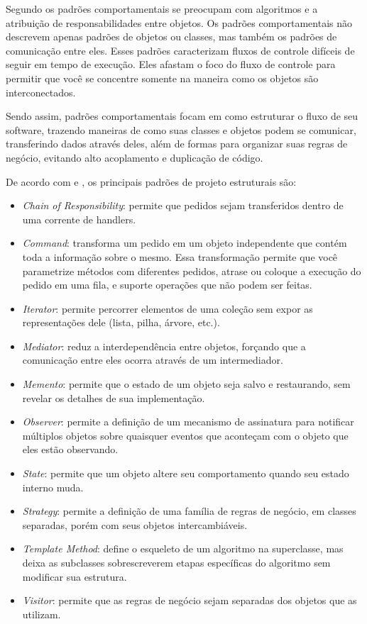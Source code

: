 \documentclass[12pt]{article}
\begin{document}
Segundo \cite{gof} os padrões comportamentais se preocupam com 
algoritmos e a atribuição de responsabilidades entre objetos. 
Os padrões comportamentais não descrevem apenas padrões de objetos 
ou classes, mas também os padrões de comunicação entre eles. 
Esses padrões caracterizam fluxos de controle difíceis de seguir 
em tempo de execução. Eles afastam o foco do fluxo de controle 
para permitir que você se concentre somente na maneira como os 
objetos são interconectados.

Sendo assim, padrões comportamentais focam em como estruturar o 
fluxo de seu software, trazendo maneiras de como suas classes e 
objetos podem se comunicar, transferindo dados através deles, 
além de formas para organizar suas regras de negócio, evitando 
alto acoplamento e duplicação de código.

De acordo com \cite{gof} e \cite{guru}, os principais padrões 
de projeto estruturais são:

\begin{itemize}
\item \textit{Chain of Responsibility}: permite que pedidos sejam 
transferidos dentro de uma corrente de handlers.
\item \textit{Command}: transforma um pedido em um objeto 
independente que contém toda a informação sobre o mesmo. 
Essa transformação permite que você parametrize métodos com 
diferentes pedidos, atrase ou coloque a execução do pedido 
em uma fila, e suporte operações que não podem ser feitas.
\item \textit{Iterator}: permite percorrer elementos de uma 
coleção sem expor as representações dele (lista, pilha, árvore, etc.).
\item \textit{Mediator}: reduz a interdependência entre 
objetos, forçando que a comunicação entre eles ocorra 
através de um intermediador.
\item \textit{Memento}: permite que o estado de um objeto 
seja salvo e restaurando, sem revelar os detalhes de 
sua implementação.
\item \textit{Observer}: permite a definição de um mecanismo 
de assinatura para notificar múltiplos objetos sobre quaisquer 
eventos que aconteçam com o objeto que eles estão observando.
\item \textit{State}: permite que um objeto altere seu 
comportamento quando seu estado interno muda.
\item \textit{Strategy}: permite a definição de uma família 
de regras de negócio, em classes separadas, porém com seus 
objetos intercambiáveis.
\item \textit{Template Method}: define o esqueleto de um 
algoritmo na superclasse, mas deixa as subclasses sobrescreverem 
etapas específicas do algoritmo sem modificar sua estrutura.
\item \textit{Visitor}: permite que as regras de negócio sejam 
separadas dos objetos que as utilizam.
\end{itemize}
\end{document}
